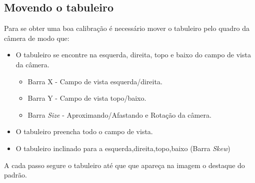 \subsection{Movendo o tabuleiro}

Para se obter uma boa calibração é necessário mover o tabuleiro pelo quadro da câmera de modo que:

\begin{itemize}
	\item{O tabuleiro se encontre na esquerda, direita, topo e baixo do campo de vista da câmera.}
	\begin{itemize}
		\item{Barra X - Campo de vista esquerda/direita.}
		\item{Barra Y - Campo de vista topo/baixo.}
		\item{Barra \textit{Size} - Aproximando/Afastando e Rotação da câmera.}
	\end{itemize}
	\item{O tabuleiro preencha todo o campo de vista.}
	\item{O tabuleiro inclinado para a esquerda,direita,topo,baixo (Barra \textit{Skew})}
\end{itemize}

A cada passo segure o tabuleiro até que que apareça na imagem o destaque do padrão.

